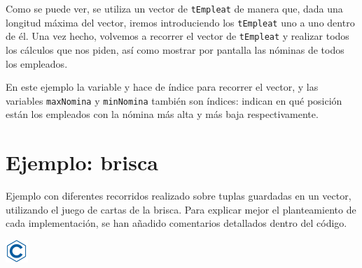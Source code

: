 \documentclass[
]{book}
\begin{document}
Como se puede ver, se utiliza un vector de \texttt{tEmpleat} de manera que, dada una longitud máxima del vector, iremos introduciendo los \texttt{tEmpleat} uno a uno dentro de él. Una vez hecho, volvemos a recorrer el vector de \texttt{tEmpleat} y realizar todos los cálculos que nos piden, así como mostrar por pantalla las nóminas de todos los empleados.

En este ejemplo la variable y hace de índice para recorrer el vector, y las variables \texttt{maxNomina} y \texttt{minNomina} también son índices: indican en qué posición están los empleados con la nómina más alta y más baja respectivamente.

\hypertarget{ejemplo-brisca}{%
\section{Ejemplo: brisca}\label{ejemplo-brisca}}

Ejemplo con diferentes recorridos realizado sobre tuplas guardadas en un vector, utilizando el juego de cartas de la brisca. Para explicar mejor el planteamiento de cada implementación, se han añadido comentarios detallados dentro del código.

\includegraphics{./img/c.png}
\end{document}
